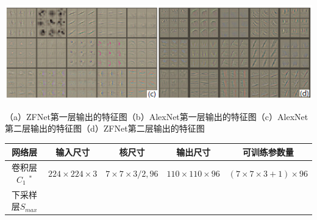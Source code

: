 \documentclass[12pt,a4paper,UTF8,twoside]{book}
\begin{document}
\begin{center}\includegraphics[width=0.7\linewidth]{img/02-06} \end{center}

（a）ZFNet第一层输出的特征图（b）AlexNet第一层输出的特征图（c）AlexNet第二层输出的特征图（d）ZFNet第二层输出的特征图

\begin{longtable}[]{@{}ccccc@{}}
\toprule
\begin{minipage}[b]{0.17\columnwidth}\centering
网络层\strut
\end{minipage} & \begin{minipage}[b]{0.17\columnwidth}\centering
输入尺寸\strut
\end{minipage} & \begin{minipage}[b]{0.17\columnwidth}\centering
核尺寸\strut
\end{minipage} & \begin{minipage}[b]{0.17\columnwidth}\centering
输出尺寸\strut
\end{minipage} & \begin{minipage}[b]{0.17\columnwidth}\centering
可训练参数量\strut
\end{minipage}\tabularnewline
\midrule
\endhead
\begin{minipage}[t]{0.17\columnwidth}\centering
卷积层\(C_1\) \(^*\)\strut
\end{minipage} & \begin{minipage}[t]{0.17\columnwidth}\centering
\(224\times224\times3\)\strut
\end{minipage} & \begin{minipage}[t]{0.17\columnwidth}\centering
\(7\times7\times3/2,96\)\strut
\end{minipage} & \begin{minipage}[t]{0.17\columnwidth}\centering
\(110\times110\times96\)\strut
\end{minipage} & \begin{minipage}[t]{0.17\columnwidth}\centering
\((7\times7\times3+1)\times96\)\strut
\end{minipage}\tabularnewline
\begin{minipage}[t]{0.17\columnwidth}\centering
下采样层\(S_{max}\)\strut

\end{minipage}
\end{longtable}
\end{document}
